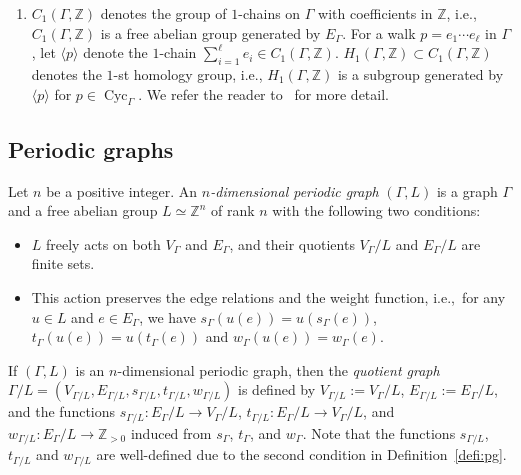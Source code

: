 \begin{defn}
\begin{enumerate}
\item 
$C_1(\Gamma, \mathbb{Z})$ denotes the group of $1$-chains on $\Gamma$ with coefficients in $\mathbb{Z}$, i.e., 
$C_1(\Gamma, \mathbb{Z})$ is a free abelian group generated by $E_{\Gamma}$. 
For a walk $p = e_1 \cdots e_{\ell}$ in $\Gamma$, let $\langle p \rangle$ denote the $1$-chain 
$\sum _{i = 1} ^{\ell} e_i \in C_1(\Gamma, \mathbb{Z})$. 
$H_1(\Gamma, \mathbb{Z}) \subset C_1(\Gamma, \mathbb{Z})$ denotes the $1$-st homology group, i.e., 
$H_1(\Gamma, \mathbb{Z})$ is a subgroup generated by $\langle p \rangle$ for $p \in \operatorname{Cyc}_{\Gamma}$. 
We refer the reader to~\cite{Sunada} for more detail. 
\end{enumerate}
\end{defn}

\subsection{Periodic graphs}

\begin{defn}\label{defi:pg}
Let $n$ be a positive integer. 
An \textit{$n$-dimensional periodic graph} $(\Gamma, L)$ is a graph $\Gamma$ and 
a free abelian group $L \simeq \mathbb{Z}^n$ of rank $n$ with the following two conditions:
\begin{itemize}
\item $L$ freely acts on both $V_\Gamma$ and $E_\Gamma$, 
and their quotients $V_\Gamma / L$ and $E_\Gamma / L$ are finite sets. 
\item This action preserves the edge relations and the weight function, i.e.,\ for any $u \in L$ and $e \in E_\Gamma$, 
we have $s_\Gamma(u(e))=u(s_\Gamma(e))$, $t_\Gamma(u(e))=u(t_\Gamma(e))$ and 
$w_{\Gamma}(u(e))=w_{\Gamma}(e)$.
\end{itemize}
\end{defn}

If $(\Gamma, L)$ is an $n$-dimensional periodic graph, 
then the \textit{quotient graph} $\Gamma /L = (V_{\Gamma/L}, E_{\Gamma/L}, s_{\Gamma/L},t_{\Gamma/L},w_{\Gamma/L})$ is defined by 
$V_{\Gamma/L} := V_{\Gamma} /L$, $E_{\Gamma/L} := E_{\Gamma} /L$, 
and the functions $s_{\Gamma/L}: E_\Gamma/L \to V_\Gamma/L$, 
$t_{\Gamma/L}: E_\Gamma/L \to V_\Gamma/L$, and 
$w_{\Gamma/L}: E_\Gamma/L \to \mathbb{Z}_{>0}$ induced from $s_{\Gamma}$, $t_{\Gamma}$, and $w_{\Gamma}$. 
Note that the functions $s_{\Gamma/L}$, $t_{\Gamma/L}$ and $w_{\Gamma/L}$ 
are well-defined due to the second condition in Definition~\ref{defi:pg}.


